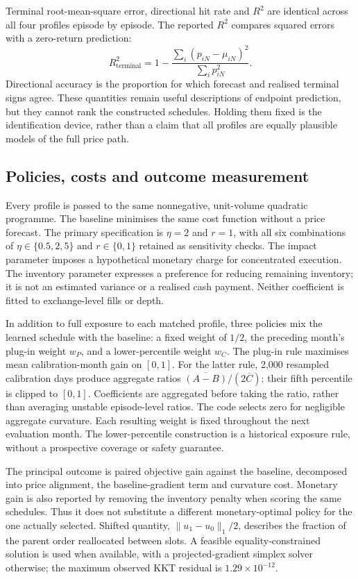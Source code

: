 Terminal root-mean-square error, directional hit rate and $R^2$ are identical across all four profiles episode by episode. The reported $R^2$ compares squared errors with a zero-return prediction:
\begin{equation}
 R^2_{\mathrm{terminal}}=1-
 \frac{\sum_i(p_{iN}-\mu_{iN})^2}{\sum_i p_{iN}^2}.
\end{equation}
Directional accuracy is the proportion for which forecast and realised terminal signs agree. These quantities remain useful descriptions of endpoint prediction, but they cannot rank the constructed schedules. Holding them fixed is the identification device, rather than a claim that all profiles are equally plausible models of the full price path.

\subsection{Policies, costs and outcome measurement}
\label{sec:policies}
Every profile is passed to the same nonnegative, unit-volume quadratic programme. The baseline minimises the same cost function without a price forecast. The primary specification is $\eta=2$ and $r=1$, with all six combinations of $\eta\in\{0.5,2,5\}$ and $r\in\{0,1\}$ retained as sensitivity checks. The impact parameter imposes a hypothetical monetary charge for concentrated execution. The inventory parameter expresses a preference for reducing remaining inventory; it is not an estimated variance or a realised cash payment. Neither coefficient is fitted to exchange-level fills or depth.

In addition to full exposure to each matched profile, three policies mix the learned schedule with the baseline: a fixed weight of $1/2$, the preceding month's plug-in weight $w_P$, and a lower-percentile weight $w_C$. The plug-in rule maximises mean calibration-month gain on $[0,1]$. For the latter rule, 2,000 resampled calibration days produce aggregate ratios $\overline{(A-B)}/(2\overline C)$; their fifth percentile is clipped to $[0,1]$. Coefficients are aggregated before taking the ratio, rather than averaging unstable episode-level ratios. The code selects zero for negligible aggregate curvature. Each resulting weight is fixed throughout the next evaluation month. The lower-percentile construction is a historical exposure rule, without a prospective coverage or safety guarantee.

The principal outcome is paired objective gain against the baseline, decomposed into price alignment, the baseline-gradient term and curvature cost. Monetary gain is also reported by removing the inventory penalty when scoring the same schedules. Thus it does not substitute a different monetary-optimal policy for the one actually selected. Shifted quantity, $\|u_1-u_0\|_1/2$, describes the fraction of the parent order reallocated between slots. A feasible equality-constrained solution is used when available, with a projected-gradient simplex solver otherwise; the maximum observed KKT residual is $1.29\times10^{-12}$.

